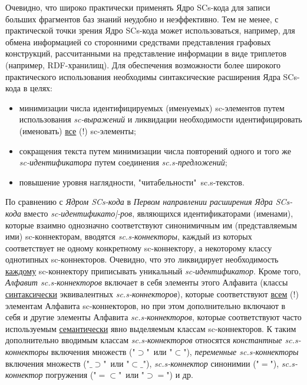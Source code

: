 Очевидно, что широко практически применять Ядро SCs-кода для записи больших фрагментов баз знаний неудобно и неэффективно. Тем не менее, с практической точки зрения Ядро SCs-кода может использоваться, например, для обмена информацией со сторонними средствами представления графовых конструкций, рассчитанными на представление информации в виде триплетов (например, RDF-хранилищ).
Для обеспечения возможности более широкого практического использования необходимы синтаксические расширения Ядра SCs-кода в целях:
\begin{itemize}
	\item минимизации числа идентифицируемых (именуемых) sc-элементов путем использования \textit{sc-выражений} и ликвидации необходимости идентифицировать (именовать) \uline{все} (!) sc-элементы;
	\item сокращения текста путем минимизации числа повторений одного и того же \textit{sc-идентификатора} путем соединения \textit{sc.s-предложений};
	\item повышение уровня наглядности, "читабельности"\ sc.s-текстов.
\end{itemize}

\begin{SCn}
\end{SCn}

По сравнению с \textit{Ядром SCs-кода} в \textit{Первом направлении расширения Ядра SCs-кода} вместо \textit{sc-идентификато|-ров}, являющихся идентификаторами (именами), которые взаимно однозначно соответствуют синонимичным им (представляемым ими) sc-коннекторам, вводятся \textit{sc.s-коннекторы}, каждый из которых соответствует не одному конкретному sc-коннектору, а некоторому классу однотипных sc-коннекторов. Очевидно, что это ликвидирует необходимость \uline{каждому} sc-коннектору приписывать уникальный \textit{sc-идентификатор}. Кроме того, \textit{Алфавит sc.s-коннекторов} включает в себя элементы этого Алфавита (классы \uline{синтаксически} эквивалентных \textit{sc.s-коннекторов}), которые соответствуют \uline{всем} (!) элементам Алфавита sc-коннекторов, но при этом дополнительно включают в себя и другие элементы Алфавита \textit{sc.s-коннекторов}, которые соответствуют часто используемым \uline{семантически} явно выделяемым классам sc-коннекторов. К таким дополнительно вводимым классам \textit{sc.s-коннекторов} относятся \textit{константные sc.s-коннекторы} включения множеств ("$\supset$"\ или "$\subset$"), \textit{переменные sc.s-коннекторы} включения множеств ("$\_\supset$"\ или "$\subset\_$"), \textit{sc.s-коннектор} синонимии ("$=$"), \textit{sc.s-коннектор} погружения ("$=\subset$"\ или "$\supset=$") и др.

